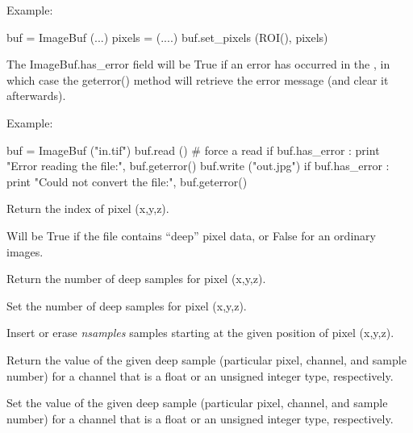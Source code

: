 \noindent Example:
\begin{code}
    buf = ImageBuf (...)
    pixels = (....)
    buf.set_pixels (ROI(), pixels)
\end{code}
\apiend

The {\cf ImageBuf.has_error} field will be {\cf True} if an error has
occurred in the \ImageBuf, in which case the {\cf geterror()} method will
retrieve the error message (and clear it afterwards).

\noindent Example:
\begin{code}
    buf = ImageBuf ("in.tif")
    buf.read ()   # force a read
    if buf.has_error :
        print "Error reading the file:", buf.geterror()
    buf.write ("out.jpg")
    if buf.has_error :
        print "Could not convert the file:", buf.geterror()
\end{code}
\apiend

\NEW %
Return the index of pixel (x,y,z).
\apiend

Will be {\cf True} if the file contains ``deep'' pixel data, or {\cf False}
for an ordinary images.
\apiend

Return the number of deep samples for pixel (x,y,z).
\apiend

Set the number of deep samples for pixel (x,y,z).
\apiend

\NEW %
Insert or erase \emph{nsamples} samples starting at the given position of
pixel {\cf (x,y,z)}.
\apiend

Return the value of the given deep sample (particular pixel, channel, and
sample number) for a channel that is a float or an unsigned integer type,
respectively.
\apiend

Set the value of the given deep sample (particular pixel, channel, and
sample number) for a channel that is a float or an unsigned integer type,
respectively.
\apiend

